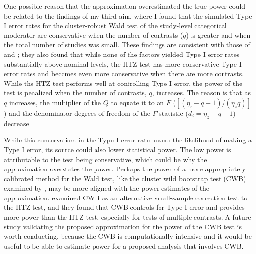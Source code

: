 One possible reason that the approximation overestimated the true power could be related to the findings of my third aim, where I found that the simulated Type I error rates for the cluster-robust Wald test of the study-level categorical moderator are conservative when the number of contrasts ($q$) is greater and when the total number of studies was small. These findings are consistent with those of \textcite{tipton2015b} and \textcite{joshi_cluster_2022}; they also found that while none of the factors yielded Type I error rates substantially above nominal levels, the HTZ test has more conservative Type I error rates and becomes even more conservative when there are more contrasts. While the HTZ test performs well at controlling Type I error, the power of the test is penalized when the number of contrasts, $q$, increases. The reason is that as $q$ increases, the multiplier of the $Q$ to equate it to an $F$ ($[(\eta_z - q +1)/(\eta_zq)]$) and the denominator degrees of freedom of the $F$-statistic ($d_2 = \eta_z - q +1$) decrease \autocite{tipton2015b}. 

While this conservatism in the Type I error rate lowers the likelihood of making a Type I error, its source could also lower statistical power. The low power is attributable to the test being conservative, which could be why the approximation overstates the power. Perhaps the power of a more appropriately calibrated method for the Wald test, like the cluster wild bootstrap test (CWB) examined by \textcite{joshi_cluster_2022}, may be more aligned with the power estimates of the approximation.  
\textcite{joshi_cluster_2022} examined CWB as an alternative small-sample correction test to the HTZ test, and they found that CWB controls for Type I error and provides more power than the HTZ test, especially for tests of multiple contrasts. A future study validating the proposed approximation for the power of the CWB test is worth conducting, because the CWB is computationally intensive and it would be useful to be able to estimate power for a proposed analysis that involves CWB. 



